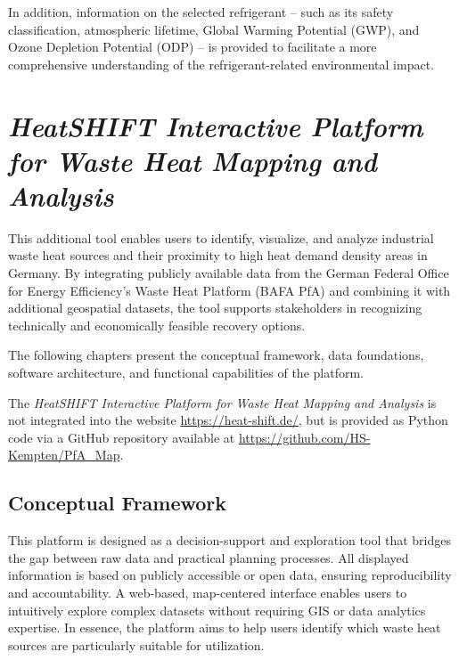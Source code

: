 \documentclass[letterpaper,11pt]{article}
\begin{document}
	In addition, information on the selected refrigerant -- such as its safety classification, atmospheric lifetime, Global Warming Potential (GWP), and Ozone Depletion Potential (ODP) \cite{vdi4646} -- is provided to facilitate a more comprehensive understanding of the refrigerant-related environmental impact.
	

\newpage
\section{\textit{HeatSHIFT Interactive Platform for Waste Heat Mapping and Analysis}}
This additional tool enables users to identify, visualize, and analyze industrial waste heat sources and their proximity to high heat demand density areas in Germany. By integrating publicly available data from the German Federal Office for Energy Efficiency’s Waste Heat Platform (BAFA PfA) and combining it with additional geospatial datasets, the tool supports stakeholders in recognizing technically and economically feasible recovery options.

The following chapters present the conceptual framework, data foundations, software architecture, and functional capabilities of the platform.

\medskip
The \textit{HeatSHIFT Interactive Platform for Waste Heat Mapping and Analysis} is not integrated into the website \url{https://heat-shift.de/}, but is provided as Python code via a GitHub repository available at \url{https://github.com/HS-Kempten/PfA_Map}.
\medskip

\subsection{Conceptual Framework}

This platform is designed as a decision-support and exploration tool that bridges the gap between raw data and practical planning processes.
All displayed information is based on publicly accessible or open data, ensuring reproducibility and accountability. A web-based, map-centered interface enables users to intuitively explore complex datasets without requiring GIS or data analytics expertise. In essence, the platform aims to help users identify which waste heat sources are particularly suitable for utilization.
\end{document}
